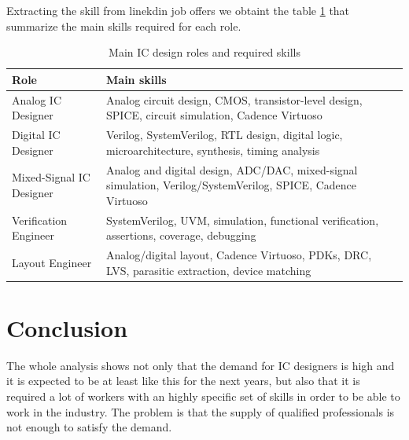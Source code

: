 \documentclass[twocolumn]{article}
\begin{document}
Extracting the skill from linekdin job offers we obtaint the table \ref{tab:ic_design_skills} that summarize the main skills required for each role.

\begin{table}[h]
    \centering
    \begin{tabular}{p{} p{}}
        \hline
        \textbf{Role} & \textbf{Main skills} \\
        \hline
        
        Analog IC Designer &
        Analog circuit design, CMOS, transistor-level design,
        SPICE, circuit simulation, Cadence Virtuoso \\

        Digital IC Designer &
        Verilog, SystemVerilog, RTL design, digital logic,
        microarchitecture, synthesis, timing analysis \\

        Mixed-Signal IC Designer &
        Analog and digital design, ADC/DAC, mixed-signal simulation,
        Verilog/SystemVerilog, SPICE, Cadence Virtuoso \\

        Verification Engineer &
        SystemVerilog, UVM, simulation, functional verification,
        assertions, coverage, debugging \\

        Layout Engineer &
        Analog/digital layout, Cadence Virtuoso, PDKs, DRC, LVS,
        parasitic extraction, device matching \\

        \hline
    \end{tabular}
    \centering
    \caption{Main IC design roles and required skills}
    \label{tab:ic_design_skills}
    \renewcommand{\arraystretch}{1.15}
\end{table}

\section{Conclusion}

The whole analysis shows not only that the demand for IC designers is high and it is expected to be at least like this for the next years, but also that it is required a lot of workers with an highly specific set of skills in order to be able to work in the industry. The problem is that the supply of qualified professionals is not enough to satisfy the demand.



\end{document}
